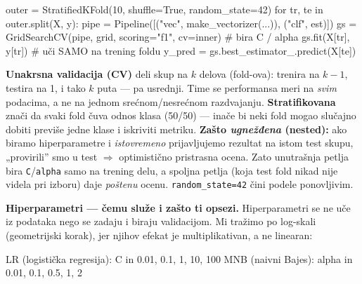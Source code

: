 \documentclass[11pt,a4paper]{article}
\newcommand{\kod}[1]{\texttt{#1}}
\begin{document}
\begin{code}
outer = StratifiedKFold(10, shuffle=True, random_state=42)
for tr, te in outer.split(X, y):
    pipe = Pipeline([("vec", make_vectorizer(...)), ("clf", est)])
    gs = GridSearchCV(pipe, grid, scoring="f1", cv=inner)   # bira C / alpha
    gs.fit(X[tr], y[tr])                # uči SAMO na trening foldu
    y_pred = gs.best_estimator_.predict(X[te])
\end{code}

\begin{teorija}
\textbf{Unakrsna validacija (CV)} deli skup na $k$ delova (fold-ova): trenira na
$k\!-\!1$, testira na 1, i tako $k$ puta --- pa usrednji. Time se performansa meri na
\emph{svim} podacima, a ne na jednom srećnom/nesrećnom razdvajanju.
\textbf{Stratifikovana} znači da svaki fold čuva odnos klasa (50/50) --- inače bi neki
fold mogao slučajno dobiti previše jedne klase i iskriviti metriku.
\textbf{Zašto \emph{ugnežđena} (nested):} ako biramo hiperparametre i \emph{istovremeno}
prijavljujemo rezultat na istom test skupu, „provirili'' smo u test $\Rightarrow$
optimistično pristrasna ocena. Zato unutrašnja petlja bira \kod{C}/\kod{alpha} samo na
trening delu, a spoljna petlja (koja test fold nikad nije videla pri izboru) daje
\emph{poštenu} ocenu. \kod{random\_state=42} čini podele ponovljivim.
\end{teorija}

\textbf{Hiperparametri --- čemu služe i zašto ti opsezi.} Hiperparametri se ne uče iz
podataka nego se zadaju i biraju validacijom. Mi tražimo po log-skali (geometrijski
korak), jer njihov efekat je multiplikativan, a ne linearan:
\begin{code}
LR  (logistička regresija):  C     in {0.01, 0.1, 1, 10, 100}
MNB (naivni Bajes):          alpha in {0.01, 0.1, 0.5, 1, 2}
\end{code}
\end{document}
